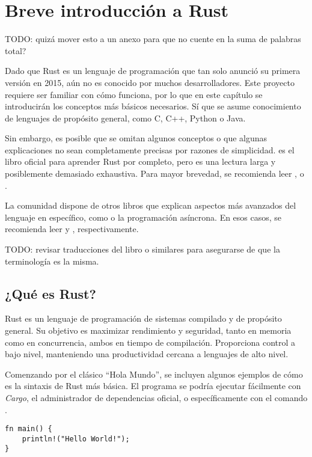 
\chapter{Breve introducción a Rust}\label{ch:rust}

TODO: quizá mover esto a un anexo para que no cuente en la suma de palabras
total?

Dado que Rust es un lenguaje de programación que tan solo anunció su primera
versión en 2015, aún no es conocido por muchos desarrolladores. Este proyecto
requiere ser familiar con cómo funciona, por lo que en este capítulo se
introducirán los conceptos más básicos necesarios. Sí que se asume conocimiento
de lenguajes de propósito general, como C, C++, Python o Java.

Sin embargo, es posible que se omitan algunos conceptos o que algunas
explicaciones no sean completamente precisas por razones de simplicidad.
\textcite{rustbook} es el libro oficial para aprender Rust por completo, pero es
una lectura larga y posiblemente demasiado exhaustiva. Para mayor brevedad, se
recomienda leer \textcite{rustprofessionals}, \textcite{rustgentleintro} o
\textcite{rust30min}.

La comunidad dispone de otros libros que explican aspectos más avanzados del
lenguaje en específico, como \unsafe o la programación asíncrona. En esos casos,
se recomienda leer \textcite{nomicon} y \textcite{rustasyncbook},
respectivamente.

TODO: revisar traducciones del libro o similares para asegurarse de que la
terminología es la misma.

\section{¿Qué es Rust?}

Rust es un lenguaje de programación de sistemas compilado y de propósito
general. Su objetivo es maximizar rendimiento y seguridad, tanto en memoria como
en concurrencia, ambos en tiempo de compilación. Proporciona control a bajo
nivel, manteniendo una productividad cercana a lenguajes de alto nivel.

Comenzando por el clásico ``Hola Mundo'', se incluyen algunos ejemplos de cómo
es la sintaxis de Rust más básica. El programa se podría ejecutar fácilmente con
\emph{Cargo}, el administrador de dependencias oficial, o específicamente con el
comando .

\begin{verbatim}
fn main() {
    println!("Hello World!");
}
\end{verbatim}


